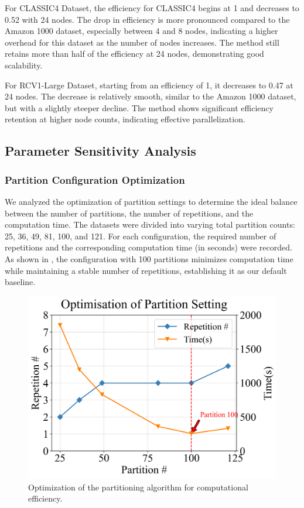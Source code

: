 \documentclass[journal]{IEEEtran}
\begin{document}
For CLASSIC4 Dataset, the efficiency for CLASSIC4 begins at 1 and decreases to 0.52 with 24 nodes. The drop in efficiency is more pronounced compared to the Amazon 1000 dataset, especially between 4 and 8 nodes, indicating a higher overhead for this dataset as the number of nodes increases. The method still retains more than half of the efficiency at 24 nodes, demonstrating good scalability.

For RCV1-Large Dataset, starting from an efficiency of 1, it decreases to 0.47 at 24 nodes. The decrease is relatively smooth, similar to the Amazon 1000 dataset, but with a slightly steeper decline. The method shows significant efficiency retention at higher node counts, indicating effective parallelization.

    {\color{blue}
        \subsection{Parameter Sensitivity Analysis}
        \label{subsec:parameter-sensitivity-analysis}

        \subsubsection{Partition Configuration Optimization}
        \label{subsec:partition-configuration-optimization}
        We analyzed the optimization of partition settings to determine the ideal balance between the number of partitions, the number of repetitions, and the computation time. The datasets were divided into varying total partition counts: 25, 36, 49, 81, 100, and 121. For each configuration, the required number of repetitions and the corresponding computation time (in seconds) were recorded. As shown in , the configuration with 100 partitions minimizes computation time while maintaining a stable number of repetitions, establishing it as our default baseline.

        \begin{figure}[htbp]
            \begin{tcolorbox}[colframe=blue, colback=white, boxrule=0.8pt, sharp corners=south]
                \centering
                \includegraphics[width=0.8\linewidth]{optimisation.png}
            \end{tcolorbox}
            \caption{Optimization of the partitioning algorithm for computational efficiency.}
            \label{fig:optimisation}
        \end{figure}

}
\end{document}
